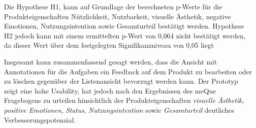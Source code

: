 Die Hypothese H1, kann auf Grundlage der berechneten p-Werte für die Produkteigenschaften Nützlichkeit, Nutzbarkeit, visuelle Ästhetik, negative Emotionen, Nutzungsintention sowie Gesamturteil bestätigt werden.
Hypothese H2 jedoch kann mit einem ermittelten p-Wert von 0,064 nicht bestätigt werden, da dieser Wert über dem festgelegten Signifikanzniveau von 0,05 liegt

Insgesamt kann zusammenfassend gesagt werden, dass die Ansicht mit Annotationen für die Aufgaben ein Feedback auf dem Produkt zu bearbeiten oder zu löschen gegenüber der Listenansicht bevorzugt werden kann. 
Der Prototyp zeigt eine hohe Usability, hat jedoch nach den Ergebnissen des meQue Fragebogens zu urteilen hinsichtlich der Produkteigenschaften \textit{visuelle Ästhetik}, \textit{positive Emotionen}, \textit{Status}, \textit{Nutzungsintention} sowie \textit{Gesamturteil} deutliches Verbesserungspotenzial.
 
